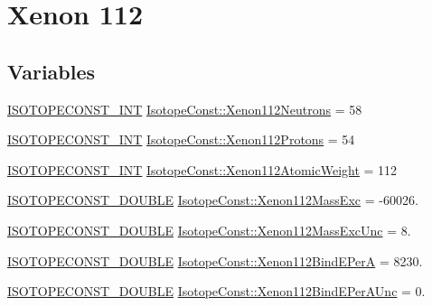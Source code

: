 \hypertarget{group___isotope_const-_xenon-_xe112}{}\section{Xenon 112}
\label{group___isotope_const-_xenon-_xe112}
\subsection*{Variables}
\begin{DoxyCompactItemize}
\item 
\mbox{\hyperlink{group___isotope_const-_macros_ga5f18360b3e99483a35c32d789e62621c}{I\+S\+O\+T\+O\+P\+E\+C\+O\+N\+S\+T\+\_\+\+I\+NT}} \mbox{\hyperlink{group___isotope_const-_xenon-_xe112_ga641237e20d04b73e66b5c101958ef277}{Isotope\+Const\+::\+Xenon112\+Neutrons}} = 58
\item 
\mbox{\hyperlink{group___isotope_const-_macros_ga5f18360b3e99483a35c32d789e62621c}{I\+S\+O\+T\+O\+P\+E\+C\+O\+N\+S\+T\+\_\+\+I\+NT}} \mbox{\hyperlink{group___isotope_const-_xenon-_xe112_ga0d504c1433a70898c331423539c2b537}{Isotope\+Const\+::\+Xenon112\+Protons}} = 54
\item 
\mbox{\hyperlink{group___isotope_const-_macros_ga5f18360b3e99483a35c32d789e62621c}{I\+S\+O\+T\+O\+P\+E\+C\+O\+N\+S\+T\+\_\+\+I\+NT}} \mbox{\hyperlink{group___isotope_const-_xenon-_xe112_gaed75e3168fba8cd39fdfcdd7ec6d9797}{Isotope\+Const\+::\+Xenon112\+Atomic\+Weight}} = 112
\item 
\mbox{\hyperlink{group___isotope_const-_macros_ga8f45a7272ce02c0b4c65c44636ed719a}{I\+S\+O\+T\+O\+P\+E\+C\+O\+N\+S\+T\+\_\+\+D\+O\+U\+B\+LE}} \mbox{\hyperlink{group___isotope_const-_xenon-_xe112_ga1de0dea82b331cdd550757aff47f3e52}{Isotope\+Const\+::\+Xenon112\+Mass\+Exc}} = -\/60026.
\item 
\mbox{\hyperlink{group___isotope_const-_macros_ga8f45a7272ce02c0b4c65c44636ed719a}{I\+S\+O\+T\+O\+P\+E\+C\+O\+N\+S\+T\+\_\+\+D\+O\+U\+B\+LE}} \mbox{\hyperlink{group___isotope_const-_xenon-_xe112_ga24ba7ca14960ffa290ad672bcf22f548}{Isotope\+Const\+::\+Xenon112\+Mass\+Exc\+Unc}} = 8.
\item 
\mbox{\hyperlink{group___isotope_const-_macros_ga8f45a7272ce02c0b4c65c44636ed719a}{I\+S\+O\+T\+O\+P\+E\+C\+O\+N\+S\+T\+\_\+\+D\+O\+U\+B\+LE}} \mbox{\hyperlink{group___isotope_const-_xenon-_xe112_gab5a6e2aa5ef7f7050afdffd789e57589}{Isotope\+Const\+::\+Xenon112\+Bind\+E\+PerA}} = 8230.
\item 
\mbox{\hyperlink{group___isotope_const-_macros_ga8f45a7272ce02c0b4c65c44636ed719a}{I\+S\+O\+T\+O\+P\+E\+C\+O\+N\+S\+T\+\_\+\+D\+O\+U\+B\+LE}} \mbox{\hyperlink{group___isotope_const-_xenon-_xe112_ga5a7033620c5d50ceb0cc1d0730c17537}{Isotope\+Const\+::\+Xenon112\+Bind\+E\+Per\+A\+Unc}} = 0.

\end{DoxyCompactItemize}
